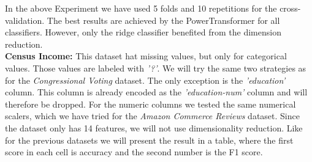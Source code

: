\documentclass[a4paper,12pt]{article}
\begin{document}
In the above Experiment we have used 5 folds and 10 repetitions for the cross-validation. The best results are achieved by the PowerTransformer for all classifiers. However, only the ridge classifier benefited from the
dimension reduction.\\
\textbf{Census Income:} This dataset hat missing values, but only for categorical values.
 Those values are labeled with \textit{'?'}. We will try the same two strategies as for the \textit{Congressional Voting} dataset.
 The only exception is the \textit{'education'} column. This column is already encoded as the
 \textit{'education-num'} column and will therefore be dropped. For the numeric columns 
 we tested the same numerical scalers, which we have tried for the 
 \textit{Amazon Commerce Reviews} dataset. Since the dataset only has 14 features,
we will not use dimensionality reduction. Like for the previous
datasets we will present the result in a table, where the first score in each cell is accuracy and the second
number is the F1 score.
\end{document}
